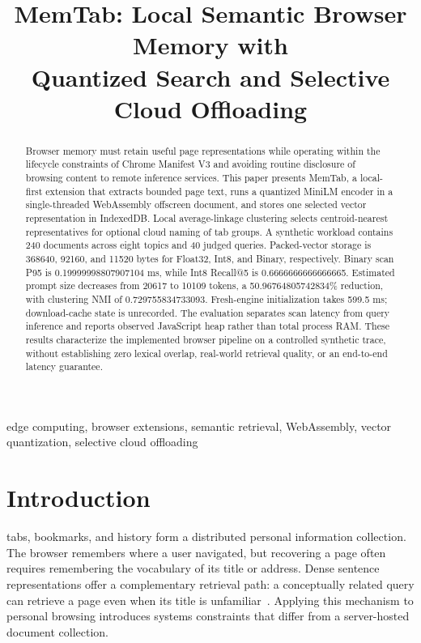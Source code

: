 \documentclass[conference]{IEEEtran}
\title{MemTab: Local Semantic Browser Memory with\\
Quantized Search and Selective Cloud Offloading}
\author{\IEEEauthorblockN{Author Name}
\IEEEauthorblockA{Department / Laboratory Name\\
Institution Name\\
City, Country\\
author@example.edu}}
\newcommand{\mDocuments}{240}
\newcommand{\mQueries}{40}
\newcommand{\mInitialization}{599.5}
\newcommand{\mNMI}{0.729755834733093}
\newcommand{\mFullTokens}{20617}
\newcommand{\mPrunedTokens}{10109}
\newcommand{\mTokenReduction}{50.96764805742834}
\newcommand{\mFloatBytes}{368640}
\newcommand{\mIntBytes}{92160}
\newcommand{\mIntRecallFive}{0.6666666666666665}
\newcommand{\mBinaryBytes}{11520}
\newcommand{\mBinaryScanTail}{0.19999998807907104}
\begin{document}
\maketitle

\begin{abstract}
Browser memory must retain useful page representations while operating within
the lifecycle constraints of Chrome Manifest V3 and avoiding routine disclosure
of browsing content to remote inference services. This paper presents MemTab,
a local-first extension that extracts bounded page text, runs a quantized
MiniLM encoder in a single-threaded WebAssembly offscreen document, and stores
one selected vector representation in IndexedDB. Local average-linkage
clustering selects centroid-nearest representatives for optional cloud naming
of tab groups. A synthetic workload contains \mDocuments{} documents across
eight topics and \mQueries{} judged queries. Packed-vector storage is
\mFloatBytes{}, \mIntBytes{}, and \mBinaryBytes{} bytes for Float32, Int8, and
Binary, respectively. Binary scan P95 is \mBinaryScanTail{} ms, while Int8
Recall@5 is \mIntRecallFive{}. Estimated prompt size decreases from
\mFullTokens{} to \mPrunedTokens{} tokens, a
\mTokenReduction{}\% reduction, with clustering NMI of \mNMI{}.
Fresh-engine initialization takes \mInitialization{} ms; download-cache
state is unrecorded. The evaluation separates scan latency from query
inference and reports observed JavaScript heap rather than total process RAM.
These results characterize the implemented browser pipeline on a controlled
synthetic trace, without establishing zero lexical overlap, real-world
retrieval quality, or an end-to-end latency guarantee.
\end{abstract}
\begin{IEEEkeywords}
edge computing, browser extensions, semantic retrieval, WebAssembly,
vector quantization, selective cloud offloading
\end{IEEEkeywords}

\section{Introduction}
 tabs, bookmarks, and history form a distributed personal
information collection. The browser remembers where a user navigated, but
recovering a page often requires remembering the vocabulary of its title or
address. Dense sentence representations offer a complementary retrieval path:
a conceptually related query can retrieve a page even when its title is
unfamiliar~\cite{reimers2019sbert,karpukhin2020dpr}. Applying this mechanism to
personal browsing introduces systems constraints that differ from a
server-hosted document collection.
\end{document}
